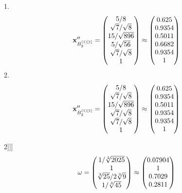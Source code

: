 \documentclass[10pt,a4paper]{article}
\begin{document}
	1.
	\[
		\bold{x}''_{B_2^{(1)[1]}} = 
		\begin{pmatrix}
			{{5}} / {{8}} \\
			{\sqrt{7}} / {\sqrt{8}} \\
			{{15}} / {\sqrt{896}} \\
			{{5}} / {\sqrt{56}} \\
			{\sqrt{7}} / {\sqrt{8}} \\
			{1}{} \\
		\end{pmatrix}
		\approx
		\begin{pmatrix}
			0.625    \\
			0.9354   \\
			0.5011   \\
			0.6682   \\
			0.9354   \\
			1        \\
		\end{pmatrix}
	\]
	2.
	\[
		\bold{x}''_{B_2^{(1)[1]}} = 
		\begin{pmatrix}
			{{5}} / {{8}} \\
			{\sqrt{7}} / {\sqrt{8}} \\
			{{15}} / {\sqrt{896}} \\
			{\sqrt{7}} / {\sqrt{8}} \\
			{\sqrt{7}} / {\sqrt{8}} \\
			{1}{} \\
		\end{pmatrix}
		\approx
		\begin{pmatrix}
			0.625    \\
			0.9354   \\
			0.5011   \\
			0.9354   \\
			0.9354   \\
			1        \\
		\end{pmatrix}
	\]

	2]]]
	\[
		\bold{\omega} = 
		\begin{pmatrix}
			{1} / {\sqrt[3]{2025}} \\
			{1}{} \\
			{\sqrt[3]{25}} / {{2}\sqrt[3]{9}} \\
			{1} / {\sqrt[3]{45}} \\
		\end{pmatrix}
		\approx
		\begin{pmatrix}
			0.07904  \\
			1        \\
			0.7029   \\
			0.2811   \\
		\end{pmatrix}
	\]
\end{document}
